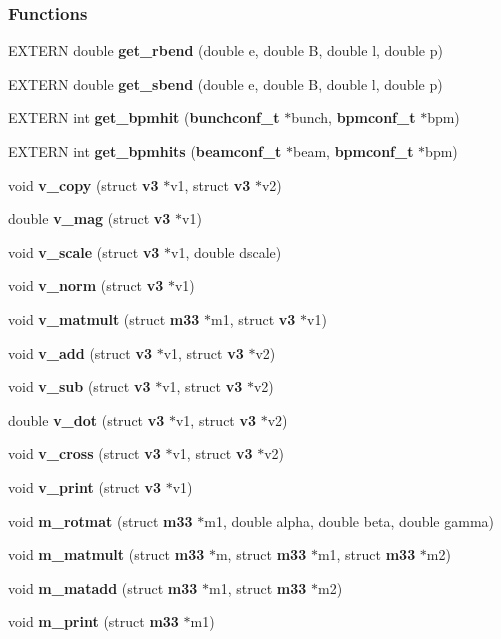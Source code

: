 \subsubsection*{Functions}
\begin{CompactItemize}
\item 
EXTERN double {\bf get\_\-rbend} (double e, double B, double l, double p)
\item 
EXTERN double {\bf get\_\-sbend} (double e, double B, double l, double p)
\item 
EXTERN int {\bf get\_\-bpmhit} ({\bf bunchconf\_\-t} $\ast$bunch, {\bf bpmconf\_\-t} $\ast$bpm)
\item 
EXTERN int {\bf get\_\-bpmhits} ({\bf beamconf\_\-t} $\ast$beam, {\bf bpmconf\_\-t} $\ast$bpm)
\item 
void {\bf v\_\-copy} (struct {\bf v3} $\ast$v1, struct {\bf v3} $\ast$v2)
\item 
double {\bf v\_\-mag} (struct {\bf v3} $\ast$v1)
\item 
void {\bf v\_\-scale} (struct {\bf v3} $\ast$v1, double dscale)
\item 
void {\bf v\_\-norm} (struct {\bf v3} $\ast$v1)
\item 
void {\bf v\_\-matmult} (struct {\bf m33} $\ast$m1, struct {\bf v3} $\ast$v1)
\item 
void {\bf v\_\-add} (struct {\bf v3} $\ast$v1, struct {\bf v3} $\ast$v2)
\item 
void {\bf v\_\-sub} (struct {\bf v3} $\ast$v1, struct {\bf v3} $\ast$v2)
\item 
double {\bf v\_\-dot} (struct {\bf v3} $\ast$v1, struct {\bf v3} $\ast$v2)
\item 
void {\bf v\_\-cross} (struct {\bf v3} $\ast$v1, struct {\bf v3} $\ast$v2)
\item 
void {\bf v\_\-print} (struct {\bf v3} $\ast$v1)
\item 
void {\bf m\_\-rotmat} (struct {\bf m33} $\ast$m1, double alpha, double beta, double gamma)
\item 
void {\bf m\_\-matmult} (struct {\bf m33} $\ast$m, struct {\bf m33} $\ast$m1, struct {\bf m33} $\ast$m2)
\item 
void {\bf m\_\-matadd} (struct {\bf m33} $\ast$m1, struct {\bf m33} $\ast$m2)
\item 
void {\bf m\_\-print} (struct {\bf m33} $\ast$m1)
\end{CompactItemize}
